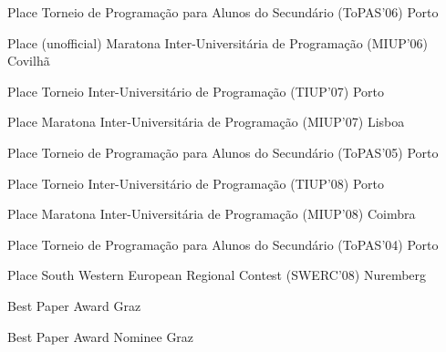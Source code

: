 \documentclass[11pt, a4paper]{awesome-cv}
\begin{document}
\begin{cvhonors}
  \cvhonor
  { Place}
  {Torneio de Programa\c{c}ão para Alunos do Secundário (ToPAS'06)}
  {Porto}
  {}

  \cvhonor
  { Place (unofficial)}
  {Maratona Inter-Universitária de Programa\c{c}ão (MIUP'06)}
  {Covilhã}
  {}

  \cvhonor
  { Place}
  {Torneio Inter-Universitário de Programa\c{c}ão (TIUP'07)}
  {Porto}
  {}



  \cvhonor
  { Place}
  {Maratona Inter-Universitária de Programa\c{c}ão (MIUP'07)}
  {Lisboa}
  {}

  \cvhonor
  { Place}
  {Torneio de Programa\c{c}ão para Alunos do Secundário (ToPAS'05)}
  {Porto}
  {}


  \cvhonor
  { Place}
  {Torneio Inter-Universitário de Programa\c{c}ão (TIUP'08)}
  {Porto}
  {}

  \cvhonor
  { Place}
  {Maratona Inter-Universitária de Programa\c{c}ão (MIUP'08)}
  {Coimbra}
  {}

  \cvhonor
  { Place}
  {Torneio de Programa\c{c}ão para Alunos do Secundário (ToPAS'04)}
  {Porto}
  {}

\end{cvhonors}

\begin{cvhonors}
  \cvhonor
  { Place}
  {South Western European Regional Contest (SWERC'08)}
  {Nuremberg}
  {}
\end{cvhonors}

\begin{cvhonors}
  \cvhonor
  {Best Paper Award}
  {}
  {Graz}
  {}

  \cvhonor
  {Best Paper Award Nominee}
  {}
  {Graz}
  {}
\end{cvhonors}
\end{document}
